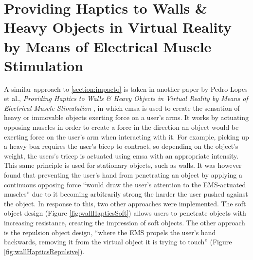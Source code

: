 \section{Providing Haptics to Walls \& Heavy Objects in Virtual Reality by Means of Electrical Muscle Stimulation}

A similar approach to \autoref{section:impacto} is taken in another paper by Pedro Lopes et al., \textit{Providing Haptics to Walls \& Heavy Objects in Virtual Reality by Means of Electrical Muscle Stimulation} \autocite{wallHaptics}, in which \gls{emsa} is used to create the sensation of heavy or immovable objects exerting force on a user's arms.
\newline
It works by actuating opposing muscles in order to create a force in the direction an object would be exerting force on the user's arm when interacting with it. For example, picking up a heavy box requires the user's bicep to contract, so depending on the object's weight, the users's tricep is actuated using \gls{emsa} with an appropriate intensity. This same principle is used for stationary objects, such as walls.
\newline
It was however found that preventing the user's hand from penetrating an object by applying a continuous opposing force \enquote{would draw the user’s attention to the EMS-actuated muscles} \autocite[p. ~2]{wallHaptics} due to it becoming arbitrarily strong the harder the user pushed against the object.
In response to this, two other approaches were implemented. The soft object design (Figure \autoref{fig:wallHapticsSoft}) allows users to penetrate objects with increasing resistance, creating the impression of soft objects. The other approach is the repulsion object design, \enquote{where the EMS propels the user’s hand backwards, removing it from the virtual object it is trying to touch} \autocite[p. ~3]{wallHaptics} (Figure \autoref{fig:wallHapticsRepulsive}).


